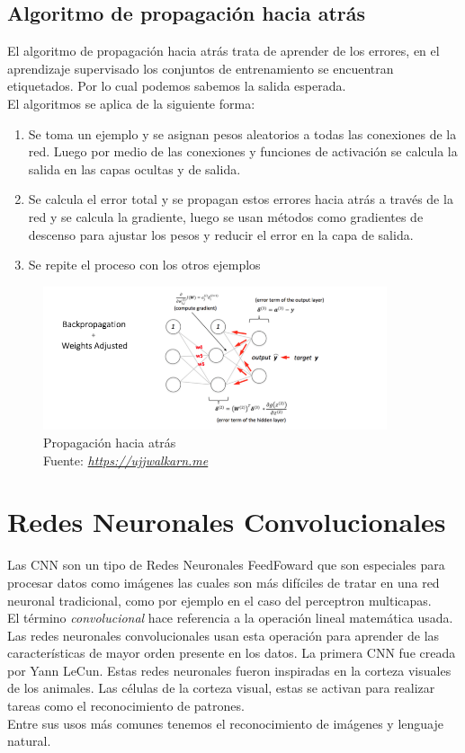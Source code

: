 \subsection{Algoritmo de propagación hacia atrás}
El algoritmo de propagación hacia atrás trata de aprender de los errores, en el aprendizaje supervisado los conjuntos de entrenamiento se encuentran etiquetados. Por lo cual podemos sabemos la salida esperada. \\
El algoritmos se aplica de la siguiente forma:

\begin{enumerate}
	\item Se toma un ejemplo y se asignan pesos aleatorios a todas las conexiones de la red. Luego por medio de las conexiones y funciones de activación se calcula la salida en las capas ocultas y de salida.
	\item Se calcula el error total y se propagan estos errores hacia atrás a través de la red y se calcula la gradiente, luego se usan métodos como gradientes de descenso para ajustar los pesos y reducir el error en la capa de salida.
	\item Se repite el proceso con los otros ejemplos
\end{enumerate}
\begin{figure}[H]
	\centering
	\includegraphics[width=0.9\textwidth]{Figures/backp.png}
	\caption{Propagación hacia atrás \\ Fuente:  \href{https://ujjwalkarn.me/2016/08/09/quick-intro-neural-networks/}{\textit{https://ujjwalkarn.me}}}
	\label{backpropagation}
\end{figure} 

\section{Redes Neuronales Convolucionales}
Las CNN son un tipo de Redes Neuronales FeedFoward que son especiales para procesar datos como imágenes las cuales son más difíciles de tratar en una red neuronal tradicional, como por ejemplo en el caso del perceptron multicapas.\\ El término \textit{convolucional} hace referencia a la operación lineal matemática usada. Las redes neuronales convolucionales usan esta operación para aprender de las características de mayor orden presente en los datos.
La primera CNN fue creada por Yann LeCun. Estas redes neuronales fueron inspiradas en la corteza visuales de los animales. Las células de la corteza visual, estas se activan para realizar tareas como el reconocimiento de patrones.\\  Entre sus usos más comunes tenemos el reconocimiento de imágenes y lenguaje natural.\\
